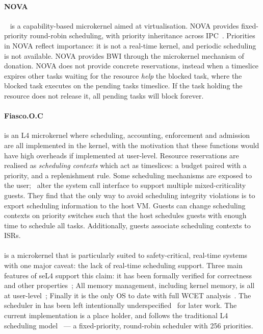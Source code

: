 \paragraph{NOVA}~\citep{Steinberg_Kauer_10} is a capability-based microkernel aimed at virtualisation. 
NOVA provides fixed-priority round-robin scheduling, with priority inheritance across IPC~\citep{Steinberg_BK_10}.
Priorities in NOVA reflect importance: it is not a real-time kernel, and periodic scheduling is not available.  
NOVA provides \gls{BWI} through the microkernel mechanism of donation. NOVA does not
provide concrete reservations, instead when a timeslice expires other tasks waiting for the resource
\emph{help} the blocked task, where the blocked task executes on the pending tasks timeslice.
If the task holding the resource does not release it, all pending tasks will block forever.

\paragraph{Fiasco.O.C} is an L4 microkernel where scheduling, accounting, enforcement and admission
are all implemented in the kernel, with the motivation that these functions would have high
overheads if implemented at user-level.  Resource reservations are realised as \emph{scheduling
contexts} which act as timeslices: a budget paired with a priority, and a replenishment rule.  Some
scheduling mechanisms are exposed to the user;~\citet{Lackorzynski_WVH_12} alter the system call
interface to support multiple mixed-criticality guests.  They find that the only way to avoid
scheduling integrity violations is to export scheduling information to the host \gls{VM}.  Guests
can change scheduling contexts on priority switches such that the host schedules guests with enough
time to schedule all tasks.  Additionally, guests associate scheduling contexts to \glspl{ISR}.

\paragraph{\selfour} is a microkernel that is particularly suited to safety-critical, real-time systems
with one major caveat: the lack of real-time scheduling support.  Three main features of seL4
support this claim: it has been formally verified for correctness~\citep{Klein_EHACDEEKNSTW_09} and
other properties~\citep{Sewell_WGMAK_11}; All memory management, including kernel memory, is all at
user-level~\citep{Elkaduwe_Derrin_06}; Finally it is the only \gls{OS} to date with full \gls{WCET}
analysis~\citep{Blackham_SCRH_11}.  The scheduler in \selfour has been left intentionally
underspecified~\citep{Petters_EH_12} for later work.  The current implementation is a place holder,
and follows the traditional L4 scheduling model~\citep{Ruocco_06} --- a fixed-priority, round-robin
scheduler with 256 priorities.


